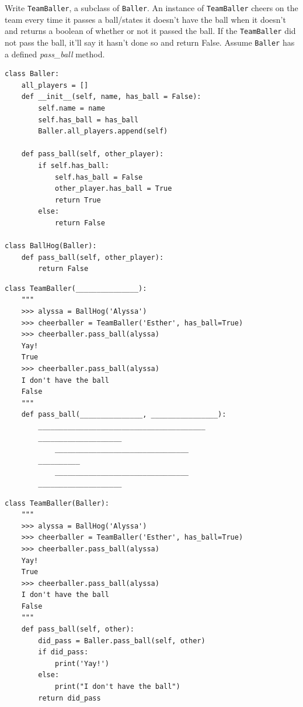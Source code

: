 \begin{blocksection}
\question Write \lstinline$TeamBaller$, a subclass of \lstinline$Baller$. An instance of \lstinline$TeamBaller$ cheers on the team every time it passes a ball/states it doesn't have the ball when it doesn't and returns a boolean of whether or not it passed the ball. If the \lstinline$TeamBaller$ did not pass the ball, it'll say it hasn't done so and return False. Assume \lstinline$Baller$ has a defined \textit{pass\_ball} method.

\begin{lstlisting}
class Baller:
    all_players = []
    def __init__(self, name, has_ball = False):
        self.name = name
        self.has_ball = has_ball
        Baller.all_players.append(self)

    def pass_ball(self, other_player):
        if self.has_ball:
            self.has_ball = False
            other_player.has_ball = True
            return True
        else:
            return False

class BallHog(Baller):
    def pass_ball(self, other_player):
        return False
\end{lstlisting}

\ifprintanswers\else
\begin{lstlisting}
class TeamBaller(_______________):
    """
    >>> alyssa = BallHog('Alyssa')
    >>> cheerballer = TeamBaller('Esther', has_ball=True)
    >>> cheerballer.pass_ball(alyssa)
    Yay! 
    True 
    >>> cheerballer.pass_ball(alyssa)
    I don't have the ball 
    False 
    """
    def pass_ball(_______________, ________________):
        ________________________________________
        ____________________
            ________________________________
        __________
            ________________________________
        ____________________
\end{lstlisting}
\fi

\begin{solution}[1in]
\begin{lstlisting}
class TeamBaller(Baller):
    """
    >>> alyssa = BallHog('Alyssa')
    >>> cheerballer = TeamBaller('Esther', has_ball=True)
    >>> cheerballer.pass_ball(alyssa)
    Yay!
    True
    >>> cheerballer.pass_ball(alyssa)
    I don't have the ball
    False
    """
    def pass_ball(self, other):
        did_pass = Baller.pass_ball(self, other)
        if did_pass:
            print('Yay!')
        else:
            print("I don't have the ball")
        return did_pass
\end{lstlisting}
\end{solution}


\end{blocksection}
